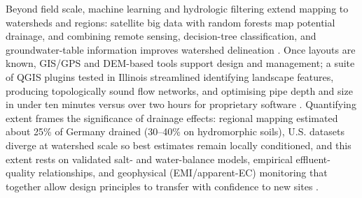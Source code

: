 \documentclass[11pt]{article}
\begin{document}
Beyond field scale, machine learning and hydrologic filtering extend mapping to
watersheds and regions: satellite big data with random forests map potential
drainage, and combining remote sensing, decision-tree classification, and
groundwater-table information improves watershed delineation
\parencite{Cho2019,Yimer2023}. Once layouts are known, GIS/GPS and
DEM-based tools support design and management; a suite of QGIS plugins tested in
Illinois streamlined identifying landscape features, producing topologically
sound flow networks, and optimising pipe depth and size in under ten minutes
versus over two hours for proprietary software
\parencite{Shedekar2018,Falasy2025,Falasy2024,Falasy2025b}. Quantifying extent
frames the significance of drainage effects: regional mapping estimated about
25\% of Germany drained (30--40\% on hydromorphic soils), U.S. datasets diverge
at watershed scale so best estimates remain locally conditioned, and this
extent rests on validated salt- and water-balance models, empirical
effluent-quality relationships, and geophysical (EMI/apparent-EC) monitoring
that together allow design principles to transfer with confidence to new sites
\parencite{Hirt2005,Hirt2011,Jame2022,Chen2025,Tian2023,Bahçeci2006,Skaggs2006,Narjary2024,Qin2025}.

\printbibliography
\end{document}
